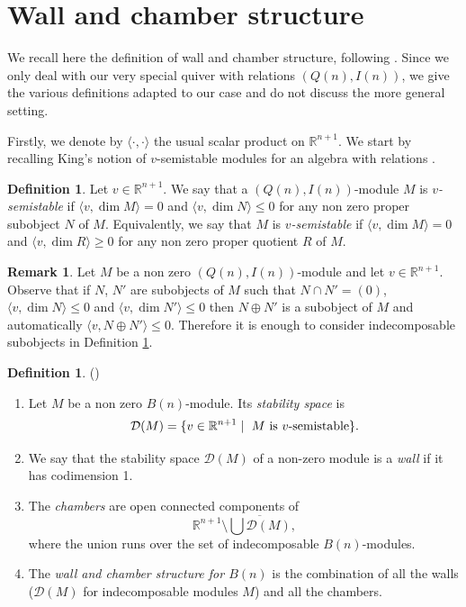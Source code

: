 \documentclass[11pt]{amsart}
\theoremstyle{definition}
\newtheorem{definition}[theorem]{Definition}
\newtheorem{remark}[theorem]{Remark}
\begin{document}
\section{Wall and chamber structure}\label{sec:WCstructure}
We recall here the definition of wall and chamber structure, following \cite[\S1.2, \S1.3]{WC_structure}. Since we only deal with our very special quiver with relations $(Q(n),I(n))$, we give the various  definitions adapted to our case and do not discuss the more general setting.

Firstly, we denote by $\langle\cdot, \cdot\rangle$ the usual scalar product on $\mathbb{R}^{n+1}$. We start by recalling King's notion of $v$-semistable modules for an algebra with relations \cite{king}.

\begin{definition}\label{defn : semistability} Let $v\in \mathbb{R}^{n+1}$. 
We say that a $(Q(n), I(n))$-module $M$ is \emph{$v$-semistable}  if $\langle v, \dim M\rangle=0$ and $\langle v, \dim N \rangle\leq 0$ for any non zero proper subobject $N$ of $M$. Equivalently, we say that $M$ is \emph{$v$-semistable} if $\langle v, \dim M\rangle=0$ and $\langle v, \dim R \rangle\geq 0$ for any  non zero proper quotient $R$ of $M$.
\end{definition}

\begin{remark}\label{rmk : stability conds indecp submods}Let $M$ be a non zero $(Q(n), I(n))$-module and let $v\in \mathbb{R}^{n+1}$.
    Observe that if $N$, $N'$ are subobjects of $M$ such that $N\cap N'=(0)$,  $\langle v, \dim N\rangle\leq 0$ and $\langle v, \dim N'\rangle\leq 0$ then $N\oplus N'$ is a subobject of $M$ and automatically $\langle v, N\oplus N'\rangle \leq 0$. Therefore it is enough to consider indecomposable subobjects in Definition \ref{defn : semistability}.
\end{remark}

\begin{definition}(\cite[Definition 11]{WC_structure})\begin{enumerate}
    \item Let $M$ be a non zero $B(n)$-module. Its \emph{stability space} is
    \[\mathcal{D}(M)=\{v\in\mathbb{R}^{n+1}\mid \ M \hbox{ is $v$-semistable}\}.\]
    \item We say that the stability space $\mathcal{D}(M)$ of a non-zero module is a \emph{wall} if it has codimension 1.
    \item The \emph{chambers} are open connected components of \[\mathbb{R}^{n+1}\setminus \overline{\bigcup \mathcal{D}(M)}, \]
    where the union runs over the set of indecomposable $B(n)$-modules.
    \item The \emph{wall and chamber structure for $B(n)$} is the combination of all the walls ($\mathcal{D}(M)$ for indecomposable modules $M$) and all the chambers.
\end{enumerate}
    \end{definition}
   
\end{document}
